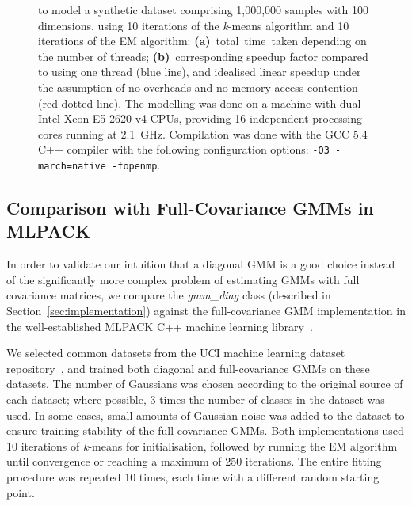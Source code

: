 \begin{figure}[!t]
{  to model a synthetic dataset comprising 1,000,000 samples with 100 dimensions,
  using 10 iterations of the {\it k}-means algorithm and 10 iterations of the EM algorithm:
  {\bf (a)}~total~time~taken depending on the number of threads;
  {\bf (b)}~corresponding speedup factor compared to using one thread (blue line), and idealised linear speedup under the assumption of no overheads and no memory access contention (red dotted line).
  The modelling was done on a machine with dual Intel Xeon E5-2620-v4 CPUs, providing 16 independent processing cores running at 2.1~GHz.
  Compilation was done with the GCC 5.4 C++ compiler with the following configuration options: \texttt{-O3 -march=native -fopenmp}.
  }
\label{fig:speedup}
\end{figure}


\subsection{Comparison with Full-Covariance GMMs in MLPACK}


In order to validate our intuition that a diagonal GMM is a good choice instead
of the significantly more complex problem of estimating GMMs with full covariance matrices,
we compare the {\it gmm\_diag} class (described in Section~\ref{sec:implementation})
against the full-covariance GMM implementation in the well-established MLPACK C++ machine learning library~\cite{Curtin_2013}.

We selected common datasets from the UCI machine learning dataset repository~\cite{Lichman_2013},
and trained both diagonal and full-covariance GMMs on these datasets.
The number of Gaussians was chosen according to the original source of each dataset;
where possible, 3 times the number of classes in the dataset was used.
In some cases, small amounts of Gaussian noise was added to the dataset to ensure
training stability of the full-covariance GMMs.
Both implementations used 10 iterations of {\it k}-means for initialisation,
followed by running the EM algorithm until convergence or reaching a maximum of 250 iterations.
The entire fitting procedure was repeated 10 times, each time with a different random starting point.

